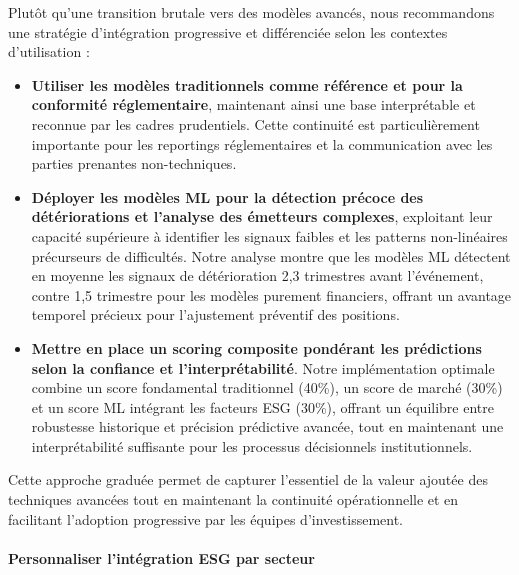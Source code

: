 Plutôt qu'une transition brutale vers des modèles avancés, nous recommandons une stratégie d'intégration progressive et différenciée selon les contextes d'utilisation :
\begin{itemize}
    \item \textbf{Utiliser les modèles traditionnels comme référence et pour la conformité réglementaire}, maintenant ainsi une base interprétable et reconnue par les cadres prudentiels. Cette continuité est particulièrement importante pour les reportings réglementaires et la communication avec les parties prenantes non-techniques.
    
    \item \textbf{Déployer les modèles ML pour la détection précoce des détériorations et l'analyse des émetteurs complexes}, exploitant leur capacité supérieure à identifier les signaux faibles et les patterns non-linéaires précurseurs de difficultés. Notre analyse montre que les modèles ML détectent en moyenne les signaux de détérioration 2,3 trimestres avant l'événement, contre 1,5 trimestre pour les modèles purement financiers, offrant un avantage temporel précieux pour l'ajustement préventif des positions.
    
    \item \textbf{Mettre en place un scoring composite pondérant les prédictions selon la confiance et l'interprétabilité}. Notre implémentation optimale combine un score fondamental traditionnel (40\%), un score de marché (30\%) et un score ML intégrant les facteurs ESG (30\%), offrant un équilibre entre robustesse historique et précision prédictive avancée, tout en maintenant une interprétabilité suffisante pour les processus décisionnels institutionnels.
\end{itemize}

Cette approche graduée permet de capturer l'essentiel de la valeur ajoutée des techniques avancées tout en maintenant la continuité opérationnelle et en facilitant l'adoption progressive par les équipes d'investissement.

\paragraph{Personnaliser l'intégration ESG par secteur}


